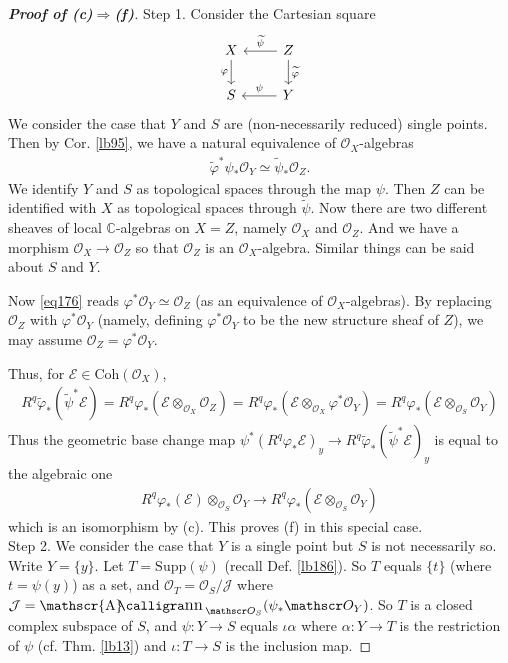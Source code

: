 \documentclass[12pt,b5paper,notitlepage]{report}
\theoremstyle{definition}
\theoremstyle{plain}
\DeclareMathOperator{\sann}{\mathscr{A}\text{\kern -3pt {\calligra\large nn}}\,}
\newcommand{\mc}{\mathcal}
\newcommand{\wtd}{\widetilde}
\newcommand{\scr}{\mathscr}
\newcommand{\Cbb}{\mathbb C}
\newcommand{\Supp}{\mathrm{Supp}}
\newcommand{\Coh}{\mathrm{Coh}}
\numberwithin{equation}{section}
\begin{document}
\begin{proof}[\textbf{Proof of (c)$\Rightarrow$(f)}]
Step 1. Consider the Cartesian square
\begin{equation}\label{eq177}
\begin{tikzcd}
X \arrow[d, "\varphi"'] & Z \arrow[l, "\wtd\psi"'] \arrow[d, "\wtd\varphi"] \\
S                       & Y \arrow[l, "\psi"']                             
\end{tikzcd}
\end{equation}
We consider the case that $Y$ and $S$ are (non-necessarily reduced) single points. Then by Cor. \ref{lb95}, we have a natural equivalence of $\scr O_X$-algebras
\begin{align}
\wtd\varphi^*\psi_*\scr O_Y\simeq\wtd\psi_*\scr O_Z. \label{eq176}
\end{align}
We identify $Y$ and $S$ as topological spaces through the map $\psi$. Then $Z$ can be identified with $X$ as topological spaces through $\wtd\psi$. Now there are two different sheaves of local $\Cbb$-algebras on $X=Z$, namely $\scr O_X$ and $\scr O_Z$. And we have a morphism $\scr O_X\rightarrow\scr O_Z$ so that $\scr O_Z$ is an $\scr O_X$-algebra. Similar things can be said about $S$ and $Y$.

Now \eqref{eq176} reads $\varphi^*\scr O_Y\simeq\scr O_Z$ (as an equivalence of $\scr O_X$-algebras). By replacing $\scr O_Z$ with $\varphi^*\scr O_Y$ (namely, defining $\varphi^*\scr O_Y$ to be the new structure sheaf of $Z$), we may assume $\scr O_Z=\varphi^*\scr O_Y$.

Thus, for $\scr E\in\Coh(\scr O_X)$, 
\begin{align*}
R^q\wtd\varphi_*(\wtd\psi^*\scr E)=R^q\varphi_*(\scr E\otimes_{\scr O_X}\scr O_Z)=R^q\varphi_*(\scr E\otimes_{\scr O_X}\varphi^*\scr O_Y)=R^q\varphi_*(\scr E\otimes_{\scr O_S}\scr O_Y)
\end{align*}
Thus the geometric base change map $\psi^*(R^q\varphi_*\scr E)_y\rightarrow R^q\wtd\varphi_*(\wtd\psi^*\scr E)_y$ is equal to the algebraic one
\begin{align*}
R^q\varphi_*(\scr E)\otimes_{\scr O_S}\scr O_Y\rightarrow R^q\varphi_*(\scr E\otimes_{\scr O_S}\scr O_Y)
\end{align*}
which is an isomorphism by (c). This proves (f) in this special case.\\

Step 2. We consider the case that $Y$ is a single point but $S$ is not necessarily so. Write $Y=\{y\}$. Let $T=\Supp(\psi)$ (recall Def. \ref{lb186}). So $T$ equals $\{t\}$ (where $t=\psi(y)$) as a set, and $\scr O_T=\scr O_S/\mc J$ where $\mc J=\sann_{\scr O_S}(\psi_*\scr O_Y)$. So $T$ is a closed complex subspace of $S$, and $\psi:Y\rightarrow S$ equals $\iota\alpha$ where $\alpha:Y\rightarrow T$ is the restriction of $\psi$ (cf. Thm. \ref{lb13}) and $\iota:T\rightarrow S$ is the inclusion map.


\end{proof}
\end{document}
